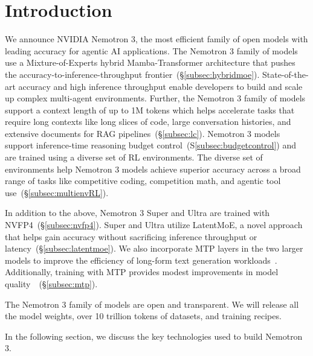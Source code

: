 \section{Introduction}
\label{sec:intro}

We announce NVIDIA Nemotron 3, the most efficient family of open models with leading accuracy for agentic AI applications. The Nemotron 3 family of models use a Mixture-of-Experts hybrid Mamba-Transformer architecture that pushes the accuracy-to-inference-throughput frontier~(\S\ref{subsec:hybridmoe}). State-of-the-art accuracy and high inference throughput enable developers to build and scale up complex multi-agent environments. Further, the Nemotron 3 family of models support a context length of up to 1M tokens which helps accelerate tasks that require long contexts like long slices of code, large conversation histories, and extensive documents for RAG pipelines~(\S\ref{subsec:lc}). Nemotron 3 models support inference-time reasoning budget control~(S\ref{subsec:budgetcontrol}) and are trained using a diverse set of RL environments. The diverse set of environments help Nemotron 3 models achieve superior accuracy across a broad range of tasks like competitive coding, competition math, and agentic tool use~(\S\ref{subsec:multienvRL}). 

In addition to the above, Nemotron 3 Super and Ultra are trained with NVFP4~(\S\ref{subsec:nvfp4}). Super and Ultra utilize LatentMoE, a novel approach that helps gain accuracy without sacrificing inference throughput or latency~(\S\ref{subsec:latentmoe}). We also incorporate MTP layers in the two larger models to improve the efficiency of long-form text generation workloads~\citep{gloeckle2024better}. Additionally, training with MTP provides modest improvements in model quality~\citep{deepseekai2025deepseekv3technicalreport}~(\S\ref{subsec:mtp}).  %


The Nemotron 3 family of models are open and transparent. We will release all the model weights, over 10 trillion tokens of datasets, and training recipes.     

In the following section, we discuss the key technologies used to build Nemotron 3.




